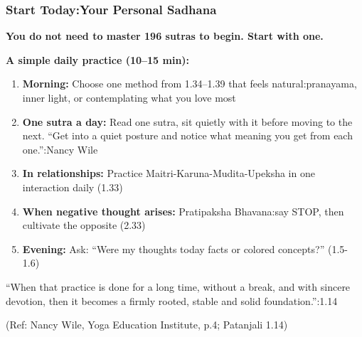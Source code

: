 \begin{frame}[fragile]\frametitle{Start Today:Your Personal Sadhana}

\begin{center}
{\normalsize \textbf{You do not need to master 196 sutras to begin. Start with one.}}
\end{center}

\vspace{3mm}
\textbf{A simple daily practice (10–15 min):}
\begin{enumerate}
\item \textbf{Morning:} Choose one method from 1.34–1.39 that feels natural:pranayama, inner light, or contemplating what you love most
\item \textbf{One sutra a day:} Read one sutra, sit quietly with it before moving to the next. ``Get into a quiet posture and notice what meaning you get from each one.'':Nancy Wile
\item \textbf{In relationships:} Practice Maitri-Karuna-Mudita-Upeksha in one interaction daily (1.33)
\item \textbf{When negative thought arises:} Pratipaksha Bhavana:say STOP, then cultivate the opposite (2.33)
\item \textbf{Evening:} Ask: ``Were my thoughts today facts or colored concepts?'' (1.5-1.6)
\end{enumerate}

\vspace{2mm}
\begin{center}
{\small ``When that practice is done for a long time, without a break, and with sincere devotion, then it becomes a firmly rooted, stable and solid foundation.'':1.14}
\end{center}

\tiny{(Ref: Nancy Wile, Yoga Education Institute, p.4; Patanjali 1.14)}

\end{frame}

